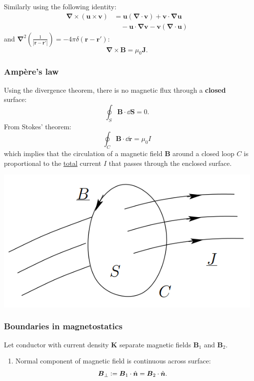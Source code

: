 \documentclass{article}
\newcommand{\deq}{\vcentcolon=}
\newcommand{\vc}[1]{\boldsymbol{#1}}
\begin{document}
\begin{multicols*}{3}
Similarly using the following identity:
\begin{align*}
    \vc{\nabla}\times(\vc{u}\times\vc{v})
    &=\vc{u}(\vc{\nabla}\cdot\vc{v})
    +\vc{v}\cdot\vc{\nabla}\vc{u} \\
    &\quad-\vc{u}\cdot\vc{\nabla}\vc{v}
    -\vc{v}(\vc{\nabla}\cdot\vc{u})
\end{align*}
and $\displaystyle\vc{\nabla}^2\left(
\frac{1}{|\vc{r}-\vc{r}'|}\right)
=-4\pi\delta(\vc{\vc{r}-\vc{r}'})$:
$$\vc{\nabla}\times\vc{B}=\mu_0\vc{J}.$$

\subsubsection*{Amp\`ere's law}
Using the divergence theorem, there is 
no magnetic flux through a \textbf{closed} surface:
$$\oint_S\vc{B}\cdot\dd\vc{S}=0.$$
From Stokes' theorem:
$$\oint_C\vc{B}\cdot\dd\vc{r}=\mu_0 I$$
which implies that the circulation of a magnetic field $\vc{B}$
around a closed loop $C$ is proportional to
the \underline{total} current $I$ that passes through
the enclosed surface.

\newcolumn

\begin{center}
    \includegraphics[scale=0.4]{f08.png}
\end{center}

\subsubsection*{Boundaries in magnetostatics}
Let conductor with current density $\vc{K}$
separate magnetic fields $\vc{B}_1$ and $\vc{B}_2$.
\begin{enumerate}
    \item Normal component of magnetic field
    is continuous across surface:
    $$\vc{B}_{\perp}\deq
    \vc{B}_1\cdot\hat{\vc{n}}=\vc{B}_2\cdot\hat{\vc{n}}.$$


\end{enumerate}
\end{multicols*}
\end{document}
